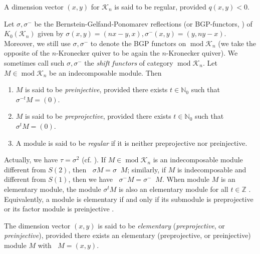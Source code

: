 \documentclass[a4paper,12pt]{amsart}
\newcommand{\cK}{\mathcal{K}}
\DeclareMathOperator{\modd}{mod}
\DeclareMathOperator{\dimu}{\underline{dim}}
\newenvironment{Definition}[1][Definition.]{\begin{trivlist}
\item[\hskip \labelsep {\bfseries #1}]}{\end{trivlist}}
\begin{document}
\begin{Definition}
A dimension vector $(x,y)$ for $\cK_n$ is said to be regular,  provided $q(x,y)<0$. 

\end{Definition}


Let $\sigma, \sigma^-$ be the Bernstein-Gelfand-Ponomarev reflections (or BGP-functors, ) of $K_0(\cK_n)$ given by $\sigma(x,y)=(nx-y,x), \sigma^-(x,y)=(y,ny-x)$. Moreover,  we still use   $\sigma, \sigma^-$ to denote the BGP functors on $\modd \cK_n$ (we  take  the opposite of the $n$-Kronecker quiver to be again the $n$-Kronecker quiver).  We sometimes call such $\sigma, \sigma^-$ the \textit{shift functors} of category $\modd\cK_n$. Let $M\in\modd \cK_n$ be an indecomposable module.  Then   


\begin{enumerate}
\item[(1)]    $M$ is said to be  \textit{preinjective},  provided there exists  $t\in \mathbb{N}_0$ such that  $\sigma^{-t} M =(0)$.

\item[(2)]  $M$ is said to be \textit{preprojective},  provided there exists  $t\in \mathbb{N}_0$ such that $\sigma^{t} M=(0)$. 

\item[(3)] A module is said to be \textit{regular} if it is neither   preprojective nor preinjective.


\end{enumerate}
Actually, we have $\tau=\sigma^2$ (cf. \cite{Gabriel}). If $M\in\modd\cK_n$ is an indecomposable module different from $S(2)$, then  $\dimu \sigma M=\sigma\dimu M$; similarly, if $M$ is indecomposable and different from $S(1)$, then we have $\dimu \sigma^-M=\sigma^- \dimu M$. When module $M$ is an elementary module, the module $\sigma^t M$  is also an elementary module for all $t\in \mathbb{Z}$ \cite[VII. Corollary 5.7$(d)$]{Assem1}. Equivalently, a module is elementary if and only if its submodule is preprojective or its factor module is preinjective \cite[Proposition 3.2]{Daniel2}.


\begin{Definition}
The dimension vector $(x,y)$ is said to be \textit{elementary} (\textit{preprojective}, or \textit{preinjective}),  provided there exists an  elementary  (preprojective, or preinjective)  module $M$ with $\dimu M=(x,y)$.
\end{Definition}
\end{document}
